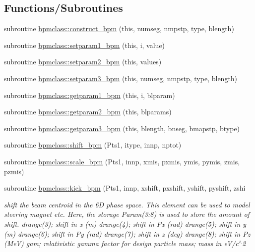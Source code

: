 \subsection*{Functions/\+Subroutines}
\begin{DoxyCompactItemize}
\item 
subroutine \mbox{\hyperlink{namespacebpmclass_a777700e03d6422437747b159baf8ac47}{bpmclass\+::construct\+\_\+bpm}} (this, numseg, nmpstp, type, blength)
\item 
subroutine \mbox{\hyperlink{namespacebpmclass_ac6cf17939baa6ee32b20af627036c73e}{bpmclass\+::setparam1\+\_\+bpm}} (this, i, value)
\item 
subroutine \mbox{\hyperlink{namespacebpmclass_a37f4e426713e3624ee853c1343294cab}{bpmclass\+::setparam2\+\_\+bpm}} (this, values)
\item 
subroutine \mbox{\hyperlink{namespacebpmclass_a75a67023bf7f429ccd2ef12a435077a7}{bpmclass\+::setparam3\+\_\+bpm}} (this, numseg, nmpstp, type, blength)
\item 
subroutine \mbox{\hyperlink{namespacebpmclass_ac5588f058f6a85c7c6c131ca7172065d}{bpmclass\+::getparam1\+\_\+bpm}} (this, i, blparam)
\item 
subroutine \mbox{\hyperlink{namespacebpmclass_ae88ec9feb4f283a3914a0859b14dc8dc}{bpmclass\+::getparam2\+\_\+bpm}} (this, blparams)
\item 
subroutine \mbox{\hyperlink{namespacebpmclass_a290f2f59ee0b68d7f56e678b87f43393}{bpmclass\+::getparam3\+\_\+bpm}} (this, blength, bnseg, bmapstp, btype)
\item 
subroutine \mbox{\hyperlink{namespacebpmclass_af08cf75c879f797ae8f03ba69e95d628}{bpmclass\+::shift\+\_\+bpm}} (Pts1, itype, innp, nptot)
\item 
subroutine \mbox{\hyperlink{namespacebpmclass_a2260a4affb3b3dc90db1d734a5e73b11}{bpmclass\+::scale\+\_\+bpm}} (Pts1, innp, xmis, pxmis, ymis, pymis, zmis, pzmis)
\item 
subroutine \mbox{\hyperlink{namespacebpmclass_a5c6269e3b899045a35e2bda31ac57c9b}{bpmclass\+::kick\+\_\+bpm}} (Pts1, innp, xshift, pxshift, yshift, pyshift, zshi
\begin{DoxyCompactList}\small\item\em shift the beam centroid in the 6D phase space. This element can be used to model steering magnet etc. Here, the storage Param(3\+:8) is used to store the amount of shift. drange(3); shift in x (m) drange(4); shift in Px (rad) drange(5); shift in y (m) drange(6); shift in Py (rad) drange(7); shift in z (deg) drange(8); shift in Pz (MeV) gam; relativistic gamma factor for design particle mass; mass in e\+V/c$^\wedge$2 \end{DoxyCompactList}\item 

\end{DoxyCompactItemize}
